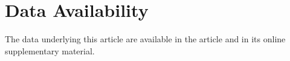 \documentclass[twocolumn]{aastex631}
\begin{document}
\section*{Data Availability}
The data underlying this article are available in the article and in its online supplementary material.












\appendix
\end{document}
